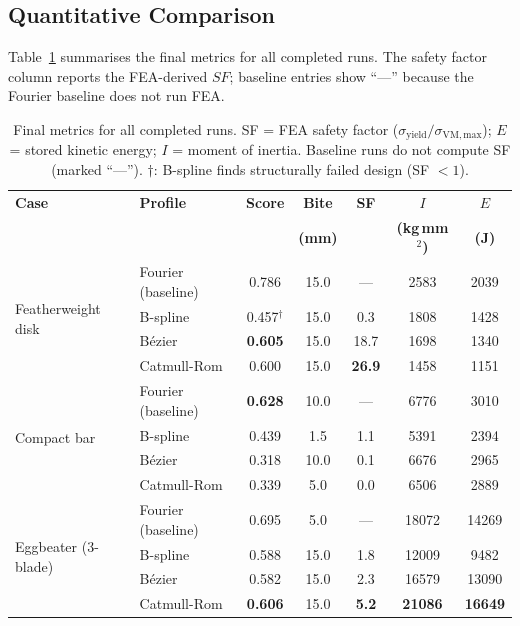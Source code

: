 \documentclass[10pt,twocolumn]{article}
\begin{document}
\subsection{Quantitative Comparison}
\label{sec:quant}

Table~\ref{tab:results} summarises the final metrics for all completed runs.
The safety factor column reports the FEA-derived $\mathit{SF}$; baseline
entries show ``---'' because the Fourier baseline does not run FEA.

\begin{table}[t]
  \caption{Final metrics for all completed runs.  SF = FEA safety factor
    ($\sigma_{\mathrm{yield}}/\sigma_{\mathrm{VM,max}}$);
    $E$ = stored kinetic energy; $I$ = moment of inertia.
    Baseline runs do not compute SF (marked ``---'').
    $\dagger$: B-spline finds structurally failed design (SF $< 1$).}
  \label{tab:results}
  \footnotesize
  \begin{tabular}{@{}p{} p{} ccccc@{}}
    \toprule
    \textbf{Case} & \textbf{Profile} & \textbf{Score} &
    \textbf{Bite} & \textbf{SF} &
    \textbf{$I$} & \textbf{$E$} \\
     & & & \textbf{(mm)} & &
    \textbf{(kg\,mm$^2$)} & \textbf{(J)} \\
    \midrule
    \multirow{4}{0.21\textwidth}{Featherweight disk}
      & Fourier (baseline) & 0.786 & 15.0 & ---   & 2583 & 2039 \\
      & B-spline           & 0.457$^\dagger$ & 15.0 & 0.3 & 1808 & 1428 \\
      & B\'{e}zier         & \textbf{0.605} & 15.0 & 18.7 & 1698 & 1340 \\
      & Catmull-Rom        & 0.600 & 15.0 & \textbf{26.9} & 1458 & 1151 \\
    \midrule
    \multirow{4}{0.21\textwidth}{Compact bar}
      & Fourier (baseline) & \textbf{0.628} & 10.0 & ---  & 6776 & 3010 \\
      & B-spline           & 0.439 &  1.5 &  1.1 & 5391 & 2394 \\
      & B\'{e}zier         & 0.318 & 10.0 &  0.1 & 6676 & 2965 \\
      & Catmull-Rom        & 0.339 &  5.0 &  0.0 & 6506 & 2889 \\
    \midrule
    \multirow{4}{0.21\textwidth}{Eggbeater (3-blade)}
      & Fourier (baseline) & 0.695 &  5.0 & ---  & 18072 & 14269 \\
      & B-spline           & 0.588 & 15.0 &  1.8 & 12009 &  9482 \\
      & B\'{e}zier         & 0.582 & 15.0 &  2.3 & 16579 & 13090 \\
      & Catmull-Rom        & \textbf{0.606} & 15.0 & \textbf{5.2} & \textbf{21086} & \textbf{16649} \\
    \bottomrule
  \end{tabular}
\end{table}
\end{document}
